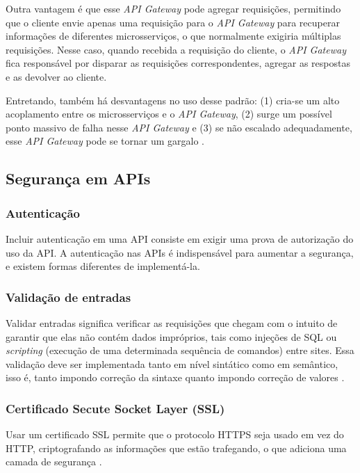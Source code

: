 Outra vantagem é que esse \emph{API Gateway} pode agregar requisições, permitindo que o cliente envie apenas uma requisição para o \emph{API Gateway} para recuperar informações de diferentes microsserviços, o que normalmente exigiria múltiplas requisições. Nesse caso, quando recebida a requisição do cliente, o \emph{API Gateway} fica responsável por disparar as requisições correspondentes, agregar as respostas e as devolver ao cliente.

Entretando, também há desvantagens no uso desse padrão: (1) cria-se um alto acoplamento entre os microsserviços e o \emph{API Gateway}, (2) surge um possível ponto massivo de falha nesse \emph{API Gateway} e (3) se não escalado adequadamente, esse \emph{API Gateway} pode se tornar um gargalo \cite{microsoft-api-gateway}.

\subsection{Segurança em APIs}

\subsubsection*{Autenticação}

Incluir autenticação em uma API consiste em exigir uma prova de autorização do uso da API. A autenticação nas APIs é indispensável para aumentar a segurança, e existem formas diferentes de implementá-la.

\subsubsection*{Validação de entradas}

Validar entradas significa verificar as requisições que chegam com o intuito de garantir que elas não contém dados impróprios, tais como injeções de SQL ou \emph{scripting} (execução de uma determinada sequência de comandos) entre sites. Essa validação deve ser implementada tanto em nível sintático como em semântico, isso é, tanto impondo correção da sintaxe quanto impondo correção de valores \cite{rapidAPI-twitter}.

\subsubsection*{Certificado Secute Socket Layer (SSL)}
Usar um certificado SSL permite que o protocolo HTTPS seja usado em vez do HTTP, criptografando as informações que estão trafegando, o que adiciona uma camada de segurança \cite{rapidAPI-twitter}.

